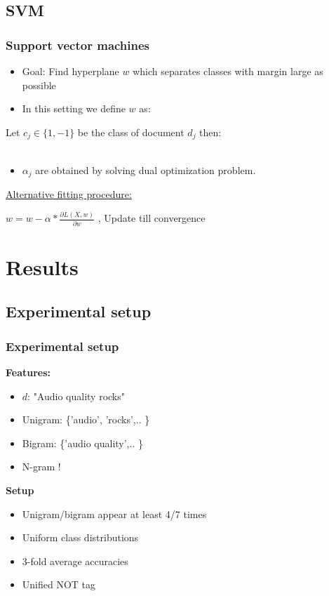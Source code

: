 \documentclass{beamer}
\begin{document}
\subsection{SVM}
\begin{frame}
	\frametitle{Support vector machines}
	\begin{itemize}
		\item Goal: Find hyperplane $w$ which separates classes with margin large as possible \pause
		\item In this setting we define $w$ as:
	\end{itemize}
	
	\begin{Definition}
		Let $c_j \in \{1,-1\}$ be the class of document $d_j$ then: \\
		 \\
	\end{Definition}
	\begin{itemize}
		\item $\alpha_{j}$ are obtained by solving dual optimization problem.
	\end{itemize}
	\pause
	\underline{Alternative fitting procedure:}
	\\
	\begin{Definition}
		\centering
		$w = w - \alpha * \frac{\partial L(X,w)}{\partial w} $ , Update till convergence
	\end{Definition}

\end{frame}
\fi

\section{Results}
\subsection{Experimental setup}
\begin{frame}
	\frametitle{Experimental setup}
\textbf{Features:}
\begin{itemize}	
	\item $d$: "Audio quality rocks"
	\item Unigram: \{'audio', 'rocks',..  \}
	\item Bigram: \{'audio quality',.. \}
	\item N-gram !
\end{itemize}

\textbf{Setup}
\begin{itemize}
	\item Unigram/bigram appear at least 4/7 times
	\item Uniform class distributions
	\item 3-fold average accuracies
	\item Unified NOT tag
\end{itemize}
\end{frame}
\end{document}
